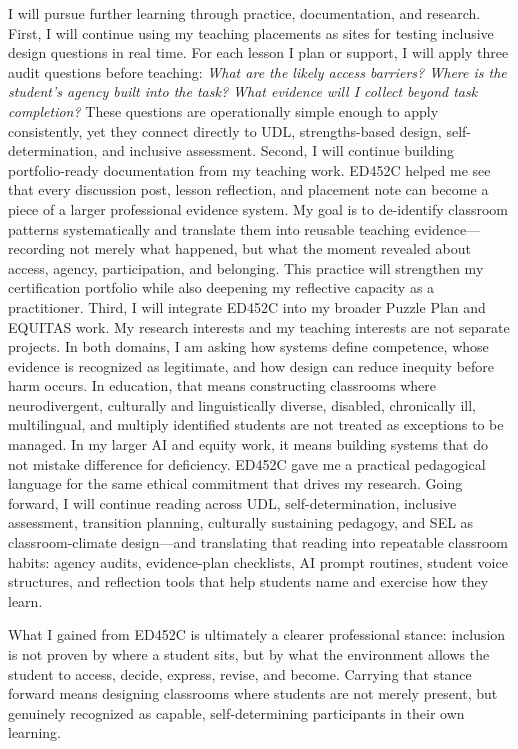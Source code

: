 \documentclass[11pt]{article}
\begin{document}
I will pursue further learning through practice, documentation, and research. First, I will continue using my teaching placements as sites for testing inclusive design questions in real time. For each lesson I plan or support, I will apply three audit questions before teaching: \textit{What are the likely access barriers? Where is the student's agency built into the task? What evidence will I collect beyond task completion?} These questions are operationally simple enough to apply consistently, yet they connect directly to UDL, strengths-based design, self-determination, and inclusive assessment. Second, I will continue building portfolio-ready documentation from my teaching work. ED452C helped me see that every discussion post, lesson reflection, and placement note can become a piece of a larger professional evidence system. My goal is to de-identify classroom patterns systematically and translate them into reusable teaching evidence---recording not merely what happened, but what the moment revealed about access, agency, participation, and belonging. This practice will strengthen my certification portfolio while also deepening my reflective capacity as a practitioner. Third, I will integrate ED452C into my broader Puzzle Plan and EQUITAS work. My research interests and my teaching interests are not separate projects. In both domains, I am asking how systems define competence, whose evidence is recognized as legitimate, and how design can reduce inequity before harm occurs. In education, that means constructing classrooms where neurodivergent, culturally and linguistically diverse, disabled, chronically ill, multilingual, and multiply identified students are not treated as exceptions to be managed. In my larger AI and equity work, it means building systems that do not mistake difference for deficiency. ED452C gave me a practical pedagogical language for the same ethical commitment that drives my research. Going forward, I will continue reading across UDL, self-determination, inclusive assessment, transition planning, culturally sustaining pedagogy, and SEL as classroom-climate design---and translating that reading into repeatable classroom habits: agency audits, evidence-plan checklists, AI prompt routines, student voice structures, and reflection tools that help students name and exercise how they learn.

What I gained from ED452C is ultimately a clearer professional stance: inclusion is not proven by where a student sits, but by what the environment allows the student to access, decide, express, revise, and become. Carrying that stance forward means designing classrooms where students are not merely present, but genuinely recognized as capable, self-determining participants in their own learning.

\newpage
\small

\end{document}
